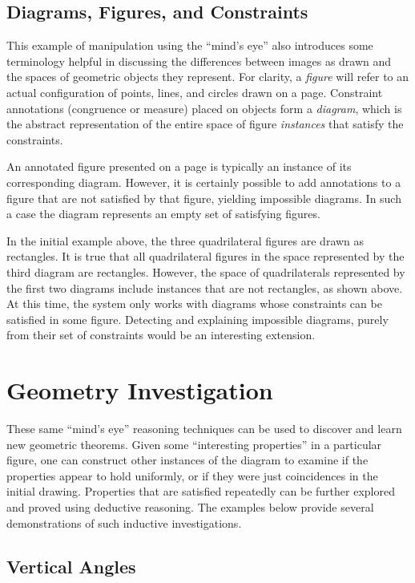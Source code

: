 \subsection{Diagrams, Figures, and Constraints}

This example of manipulation using the ``mind's eye'' also introduces
some terminology helpful in discussing the differences between images
as drawn and the spaces of geometric objects they represent.  For
clarity, a \emph{figure} will refer to an actual configuration of
points, lines, and circles drawn on a page.  Constraint annotations
(congruence or measure) placed on objects form a \emph{diagram},
which is the abstract representation of the entire space of figure
\emph{instances} that satisfy the constraints.

An annotated figure presented on a page is typically an instance of
its corresponding diagram.  However, it is certainly possible to add
annotations to a figure that are not satisfied by that figure,
yielding impossible diagrams.  In such a case the diagram represents
an empty set of satisfying figures.

In the initial example above, the three quadrilateral figures are
drawn as rectangles.  It is true that all quadrilateral figures in the
space represented by the third diagram are rectangles.  However, the
space of quadrilaterals represented by the first two diagrams include
instances that are not rectangles, as shown above.  At this time, the
system only works with diagrams whose constraints can be satisfied in
some figure.  Detecting and explaining impossible diagrams, purely
from their set of constraints would be an interesting extension.

\newpage
\section{Geometry Investigation}

These same ``mind's eye'' reasoning techniques can be used to discover
and learn new geometric theorems.  Given some ``interesting
properties'' in a particular figure, one can construct other instances
of the diagram to examine if the properties appear to hold uniformly,
or if they were just coincidences in the initial drawing.  Properties
that are satisfied repeatedly can be further explored and proved using
deductive reasoning.  The examples below provide several
demonstrations of such inductive investigations.

\subsection{Vertical Angles}

